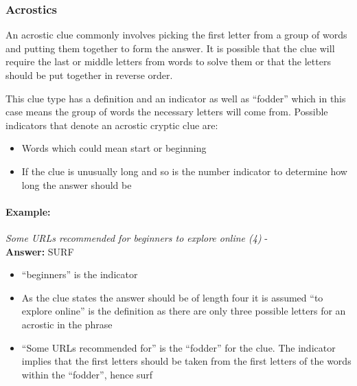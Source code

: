 \subsubsection{Acrostics}

An acrostic clue commonly involves picking the first letter from a group of
words and putting them together to form the answer. It is possible that the clue
will require the last or middle letters from words to solve them or that the
letters should be put together in reverse order.

This clue type has a definition and an indicator as well as ``fodder'' which in
this case means the group of words the necessary letters will come from.
Possible indicators that denote an acrostic cryptic  clue are:

\begin{itemize}
    \item Words which could mean start or beginning 
    \item If the clue is unusually long and so is the number indicator to 
    determine how long the answer should be 
\end{itemize}

\paragraph{Example:} \emph{Some URLs recommended for beginners to explore online (4)} - \citep{shuchiAcrostics08} \\
\textbf{Answer:} SURF 

\begin{itemize}
    \item ``beginners'' is the indicator 
    \item As the clue states the answer should be of length four it is assumed 
    ``to explore online'' is the definition as there are only three possible 
    letters for an acrostic in the phrase 
    \item ``Some URLs recommended for'' is the ``fodder'' for the clue. The 
    indicator implies that the first letters should be taken from the first 
    letters of the words within the ``fodder'', hence surf  
\end{itemize}